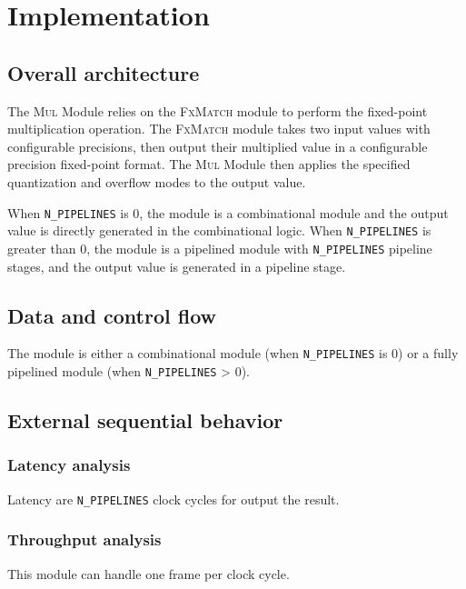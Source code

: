 \documentclass[a4paper, oneside]{report}
\begin{document}
        

    \chapter{Implementation}
        \section{Overall architecture}
                The \textsc{Mul} Module relies on the \textsc{FxMatch} module to perform the fixed-point multiplication operation. The \textsc{FxMatch} module takes two input values with configurable precisions, then output their multiplied value in a configurable precision fixed-point format. The \textsc{Mul} Module then applies the specified quantization and overflow modes to the output value.

                When \texttt{N\_PIPELINES} is 0, the module is a combinational module and the output value is directly generated in the combinational logic. When \texttt{N\_PIPELINES} is greater than 0, the module is a pipelined module with \texttt{N\_PIPELINES} pipeline stages, and the output value is generated in a pipeline stage.
                
        \section{Data and control flow}
            The module is either a combinational module (when \texttt{N\_PIPELINES} is 0) or a fully pipelined module (when \texttt{N\_PIPELINES} > 0). 
            \section{External sequential behavior}
            \subsection{Latency analysis}
                Latency are \texttt{N\_PIPELINES} clock cycles for output the result.
            \subsection{Throughput analysis}
                This module can handle one frame per clock cycle.


\end{document}
